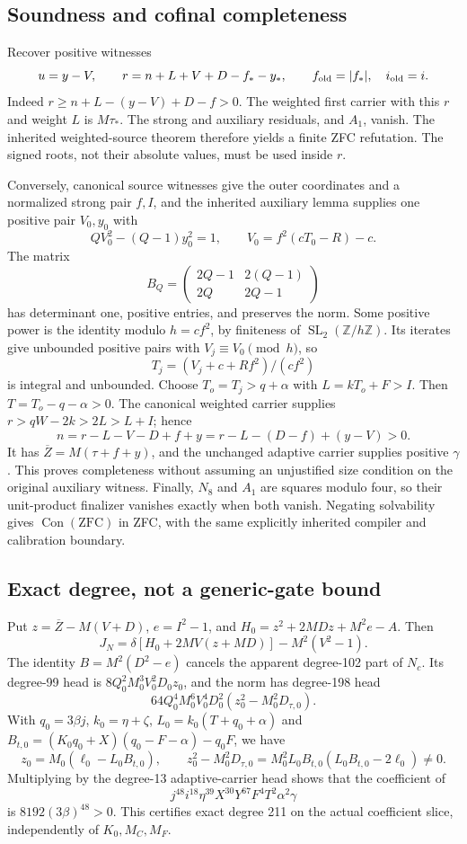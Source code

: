 \subsection{Soundness and cofinal completeness}
Recover positive witnesses
\[
 u=y-V,\qquad
 r=n+L+V+D-f_*-y_*,\qquad f_{\rm old}=|f_*|,\quad i_{\rm old}=i.
\]
Indeed $r\ge n+L-(y-V)+D-f>0$.  The weighted first carrier with
this $r$ and weight $L$ is $M\tau_*$.  The strong and auxiliary residuals,
and $A_1$, vanish.  The inherited weighted-source theorem therefore yields
a finite ZFC refutation.  The signed roots, not their absolute values,
must be used inside $r$.

Conversely, canonical source witnesses give the outer coordinates and a
normalized strong pair $f,I$, and the inherited auxiliary lemma supplies
one positive pair $V_0,y_0$ with
\[
 QV_0^2-(Q-1)y_0^2=1,\qquad V_0=f^2(cT_0-R)-c.
\]
The matrix
\[
 B_Q=\begin{pmatrix}2Q-1&2(Q-1)\\2Q&2Q-1\end{pmatrix}
\]
has determinant one, positive entries, and preserves the norm.
Some positive power is the identity modulo $h=cf^2$, by finiteness of
$\operatorname{SL}_2(\mathbb Z/h\mathbb Z)$.  Its iterates give unbounded
positive pairs with $V_j\equiv V_0\pmod h$, so
\[
 T_j=(V_j+c+Rf^2)/(cf^2)
\]
is integral and unbounded.  Choose $T_o=T_j>q+\alpha$ with
$L=kT_o+F>I$.  Then $T=T_o-q-\alpha>0$.
The canonical weighted carrier supplies
$r>qW-2k>2L>L+I$; hence
\[
 n=r-L-V-D+f+y=r-L-(D-f)+(y-V)>0.
\]
It has $\overline Z=M(\tau+f+y)$, and the unchanged adaptive carrier
supplies positive $\gamma$.  This proves completeness without assuming
an unjustified size condition on the original auxiliary witness.
Finally, $N_8$ and $A_1$ are squares modulo four, so their unit-product
finalizer vanishes exactly when both vanish.  Negating solvability gives
$\operatorname{Con}(\mathrm{ZFC})$ in ZFC, with the same explicitly
inherited compiler and calibration boundary.

\subsection{Exact degree, not a generic-gate bound}
Put $z=\overline Z-M(V+D)$, $e=I^2-1$, and
$H_0=z^2+2MDz+M^2e-A$.  Then
\[
 J_N=\delta[H_0+2MV(z+MD)]-M^2(V^2-1).
\]
The identity $B=M^2(D^2-e)$ cancels the apparent degree-102 part of
$N_c$.  Its degree-99 head is $8Q_0^2M_0^3V_0^2D_0z_0$, and the
norm has degree-198 head
\[
 64Q_0^4M_0^6V_0^4D_0^2(z_0^2-M_0^2D_{\tau,0}).
\]
With $q_0=3\beta j$, $k_0=\eta+\zeta$,
$L_0=k_0(T+q_0+\alpha)$ and
$B_{t,0}=(K_0q_0+X)(q_0-F-\alpha)-q_0F$, we have
\[
 z_0=M_0(\ell_0-L_0B_{t,0}),\qquad
 z_0^2-M_0^2D_{\tau,0}
 =M_0^2L_0B_{t,0}(L_0B_{t,0}-2\ell_0)\ne0.
\]
Multiplying by the degree-13 adaptive-carrier head shows that the
coefficient of
\[
 j^{48}i^{18}\eta^{39}X^{30}Y^{67}F^4T^2\alpha^2\gamma
\]
is $8192(3\beta)^{48}>0$.  This certifies exact degree 211 on the
actual coefficient slice, independently of $K_0,M_C,M_F$.

